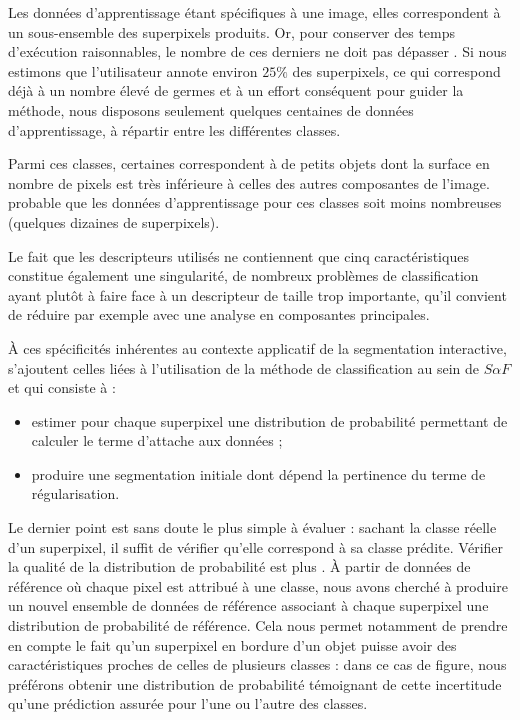 Les données d'apprentissage étant spécifiques à une image, elles correspondent à un sous-ensemble des superpixels produits. Or, pour conserver des temps d'exécution raisonnables, le nombre de ces derniers ne doit pas dépasser . Si nous estimons que l'utilisateur annote environ $25 \%$ des superpixels, ce qui correspond déjà à un nombre élevé de germes et à un effort conséquent pour guider la méthode, nous disposons  seulement quelques centaines de données d'apprentissage, à répartir entre les différentes classes. 

Parmi ces classes, certaines correspondent à de petits objets dont la surface en nombre de pixels est très inférieure à celles des autres composantes de l'image. probable que les données d'apprentissage pour ces classes soit moins nombreuses (quelques dizaines de superpixels).

Le fait que les descripteurs utilisés ne contiennent que cinq caractéristiques constitue également une singularité, de nombreux problèmes de classification ayant plutôt à faire face à un descripteur de taille trop importante, qu'il convient de réduire\modif{,} par exemple avec une analyse en composantes principales.

À ces spécificités inhérentes au contexte applicatif de la segmentation interactive, s'ajoutent celles liées à l'utilisation de la	 méthode de classification au sein de $S \alpha F$ et qui consiste à :
\begin{itemize}
\item estimer pour chaque superpixel une distribution de probabilité permettant de calculer le terme d'attache aux données ;
\item produire une segmentation initiale dont dépend la pertinence du terme de régularisation.
\end{itemize}

Le dernier point est sans doute le plus simple à évaluer : sachant la classe réelle d'un superpixel, il suffit de vérifier qu'elle correspond à sa classe prédite. Vérifier la qualité de la distribution de probabilité est plus . À partir de données de référence où chaque pixel est attribué à une classe, nous avons cherché à produire un nouvel ensemble de données de référence associant à chaque superpixel une distribution de probabilité de référence. Cela nous permet notamment de prendre en compte le fait qu'un superpixel en bordure d'un objet puisse avoir des caractéristiques proches de celles de plusieurs classes : dans ce cas de figure, nous préférons obtenir une distribution de probabilité témoignant de cette incertitude qu'une prédiction assurée pour l'une ou l'autre des classes. 

